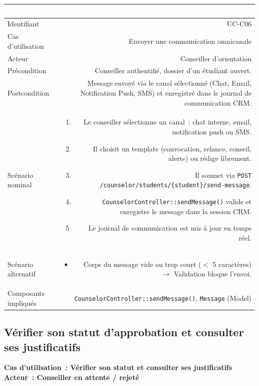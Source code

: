 \documentclass[a4paper,12pt]{article}
\newcommand{\ucheader}[2]{%
  \noindent\colorbox{capblue}{\parbox{\dimexpr\linewidth-2\fboxsep}{%
    \color{white}\bfseries\large Cas d'utilisation~: #1 \hfill \normalsize Acteur~: #2
  }}\\[2pt]
}
\begin{document}
\noindent
\begin{tabular}{|L|R|}
\hline
{}\textcolor{white}{\textbf{Champ}} & \textcolor{white}{\textbf{Description}} \\
\hline
{}Identifiant & UC-C06 \\
\hline
Cas d'utilisation & Envoyer une communication omnicanale \\
\hline
{}Acteur & Conseiller d'orientation \\
\hline
Précondition & Conseiller authentifié, dossier d'un étudiant ouvert. \\
\hline
{}Postcondition & Message envoyé via le canal sélectionné (Chat, Email, Notification Push, SMS) et enregistré dans le journal de communication CRM. \\
\hline
Scénario nominal &
\begin{enumerate}
  \item Le conseiller sélectionne un canal~: chat interne, email, notification push ou SMS.
  \item Il choisit un template (convocation, relance, conseil, alerte) ou rédige librement.
  \item Il soumet via \texttt{POST /counselor/students/\{student\}/send-message}.
  \item \texttt{CounselorController::sendMessage()} valide et enregistre le message dans la session CRM.
  \item Le journal de communication est mis à jour en temps réel.
\end{enumerate} \\
\hline
{}Scénario alternatif &
\begin{itemize}
  \item Corps du message vide ou trop court ($<$ 5 caractères) $\rightarrow$ Validation bloque l'envoi.
\end{itemize} \\
\hline
Composants impliqués & \texttt{CounselorController::sendMessage()}, \texttt{Message} (Model) \\
\hline
\end{tabular}

\vspace{1em}

\subsection{Vérifier son statut d'approbation et consulter ses justificatifs}
\ucheader{Vérifier son statut et consulter ses justificatifs}{Conseiller en attente / rejeté}
\end{document}
